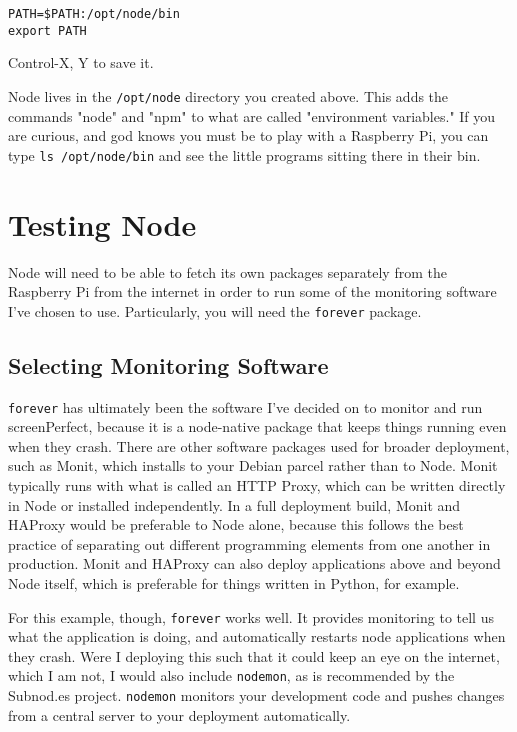 \begin{lstlisting}
PATH=$PATH:/opt/node/bin 
export PATH
\end{lstlisting}

Control-X, Y to save it.

Node lives in the \texttt{/opt/node} directory you created above. This adds the commands "node" and "npm" to what are called "environment variables." If you are curious, and god knows you must be to play with a Raspberry Pi, you can type \texttt{ls /opt/node/bin} and see the little programs sitting there in their bin.

\section{Testing Node}
Node will need to be able to fetch its own packages separately from the Raspberry Pi from the internet in order to run some of the monitoring software I've chosen to use. Particularly, you will need the \texttt{forever} package.

\subsection{Selecting Monitoring Software}
\texttt{forever} has ultimately been the software I've decided on to monitor and run screenPerfect, because it is a node-native package that keeps things running even when they crash. There are other software packages used for broader deployment, such as Monit, which installs to your Debian parcel rather than to Node. Monit typically runs with what is called an HTTP Proxy, which can be written directly in Node or installed independently. In a full deployment build, Monit and HAProxy would be preferable to Node alone, because this follows the best practice of separating out different programming elements from one another in production. Monit and HAProxy can also deploy applications above and beyond Node itself, which is preferable for things written in Python, for example. 

For this example, though, \texttt{forever} works well. It provides monitoring to tell us what the application is doing, and automatically restarts node applications when they crash. Were I deploying this such that it could keep an eye on the internet, which I am not, I would also include \texttt{nodemon}, as is recommended by the Subnod.es project. \texttt{nodemon} monitors your development code and pushes changes from a central server to your deployment automatically.

